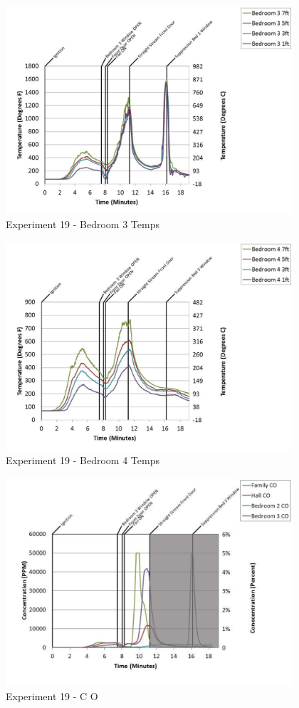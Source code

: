 \documentclass{article}
\begin{document}
\begin{appendices}
	\begin{figure}[h!]
		\centering
		\includegraphics[height=3.05in]{0_Images/Results_Charts/Exp_19_Charts/Bedroom3Temps.pdf}
		\caption{Experiment 19 - Bedroom 3 Temps}
	\end{figure}
 
	\clearpage

	\begin{figure}[h!]
		\centering
		\includegraphics[height=3.05in]{0_Images/Results_Charts/Exp_19_Charts/Bedroom4Temps.pdf}
		\caption{Experiment 19 - Bedroom 4 Temps}
	\end{figure}
 

	\begin{figure}[h!]
		\centering
		\includegraphics[height=3.05in]{0_Images/Results_Charts/Exp_19_Charts/CO.pdf}
		\caption{Experiment 19 - C O}
	\end{figure}
 

\end{appendices}
\end{document}
